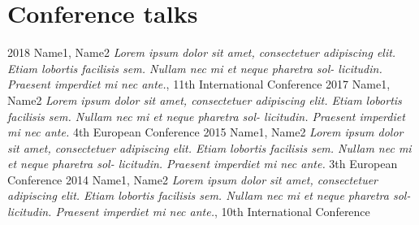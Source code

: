 \documentclass[11pt,a4paper]{smooth-banner-cv}
\begin{document}
\begin{sidebar}

  \vspace{1.15cm}

  

  

  
  
  {\begin{center}  \end{center}}
      
\end{sidebar}

\section{Conference talks}

\begin{simplelist}
   \simplelistitem
       {2018}
       {Name1, Name2 \newline
         \emph{Lorem ipsum dolor sit amet, consectetuer adipiscing elit. Etiam
          lobortis facilisis sem. Nullam nec mi et neque pharetra sol-
          licitudin. Praesent imperdiet mi nec ante.}, \newline 11th International Conference}
    \simplelistitem
        {2017}
        {Name1, Name2 \newline\emph{Lorem ipsum dolor sit amet, consectetuer adipiscing elit. Etiam
          lobortis facilisis sem. Nullam nec mi et neque pharetra sol-
          licitudin. Praesent imperdiet mi nec ante.} \newline 4th European Conference}
    \simplelistitem
        {2015}
        {Name1, Name2 \newline\emph{Lorem ipsum dolor sit amet, consectetuer adipiscing elit. Etiam
          lobortis facilisis sem. Nullam nec mi et neque pharetra sol-
          licitudin. Praesent imperdiet mi nec ante.} \newline 3th European Conference}
    \simplelistitem
        {2014}
        {Name1, Name2 \newline
          \emph{Lorem ipsum dolor sit amet, consectetuer adipiscing elit. Etiam
          lobortis facilisis sem. Nullam nec mi et neque pharetra sol-
          licitudin. Praesent imperdiet mi nec ante.}, \newline 10th International Conference}
\end{simplelist}
\end{document}

